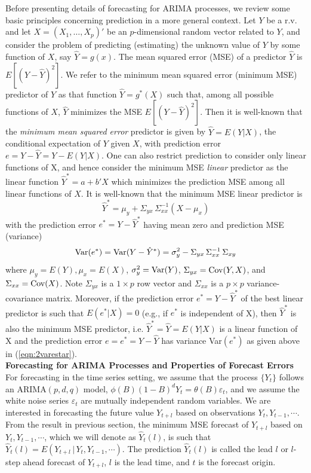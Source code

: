 Before presenting details of forecasting for ARIMA processes, we review some basic principles concerning prediction in a more general context. Let $Y$ be a r.v. and let $X = (X_1,\ldots,X_p)'$ be an $p$-dimensional random vector related to $Y$, and consider the problem of predicting (estimating) the unknown value of $Y$ by some function of $X$, say $\hat{Y} = g(x)$. The mean squared error (MSE) of a predictor $\hat{Y}$ is $E[(Y - \hat{Y})^2]$. We refer to the minimum mean squared error (minimum MSE) predictor of $Y$ as that function $\hat{Y} = g^*(X)$ such that, among all possible functions of $X$, $\hat{Y}$ minimizes the MSE $E[(Y - \hat{Y})^2]$. Then it is well-known that the \textit{minimum mean squared error} predictor is given by $\hat{Y} = E(Y|X)$, the conditional expectation of $Y$ given $X$, with prediction error $e = Y - \hat{Y} = Y - E(Y|X)$. One can also restrict prediction to consider only linear functions of X, and hence consider the minimum MSE \textit{linear} predictor as the linear function $\hat{Y}^* = a + b' X$ which minimizes the prediction MSE among all linear functions of $X$. It is well-known that the minimum MSE linear predictor is
	\begin{equation}\label{eqn:2yhatstar}
	\hat{Y}^* = \mu_y + \Sigma_{yx}\,\Sigma_{xx}^{-1}(X - \mu_x)
	\end{equation}
with the prediction error $e^* = Y - \hat{Y}^*$ having mean zero and prediction MSE (variance)
	\begin{equation}\label{eqn:2varestar}
	\Var(e^*) = \Var(Y - \hat{Y}^*) = \sigma_y^2 - \Sigma_{yx}\,\Sigma_{xx}^{-1}\,\Sigma_{xy}
	\end{equation}
where $\mu_y = E(Y), \mu_x = E(X)$, $\sigma_y^2 = \operatorname{Var}(Y)$, $\Sigma_{yx} = \operatorname{Cov}(Y,X)$, and $\Sigma_{xx} = \operatorname{Cov}(X)$. Note $\Sigma_{yx}$ is a $1 \times p$ row vector and $\Sigma_{xx}$ is a $p \times p$ variance-covariance matrix. Moreover, if the prediction error $e^* = Y - \hat{Y}^*$ of the best linear predictor is such that $E(e^*|X) = 0$ (e.g., if $e^*$ is independent of X), then $\hat{Y}^*$ is also the minimum MSE predictor, i.e. $\hat{Y}^* = \hat{Y} = E(Y|X)$ is a linear function of X and the prediction error $e = e^* = Y - \hat{Y}$ has variance Var$(e^*)$ as given above in (\ref{eqn:2varestar}). \\


\noindent\textbf{Forecasting for ARIMA Processes and Properties of Forecast Errors} \\


For forecasting in the time series setting, we assume that the process $\{Y_t\}$ follows an ARIMA$(p,d,q)$ model, $\phi(B)(1 - B)^dY_t = \theta(B)\varepsilon_t$, and we assume the white noise series $\varepsilon_t$ are mutually independent random variables. We are interested in forecasting the future value $Y_{t+l}$ based on observations $Y_t,Y_{t-1},\cdots$. From the result in previous section, the minimum MSE forecast of $Y_{t+l}$ based on $Y_t,Y_{t-1},\cdots$, which we will denote as $\hat{Y}_t(l)$, is such that $\hat{Y}_t(l) = E(Y_{t+l}\,|\,Y_t,Y_{t-1},\cdots)$. The prediction $\hat{Y}_t(l)$ is called the lead $l$ or $l$-step ahead forecast of $Y_{t+l}$, $l$ is the lead time, and $t$ is the forecast origin.


